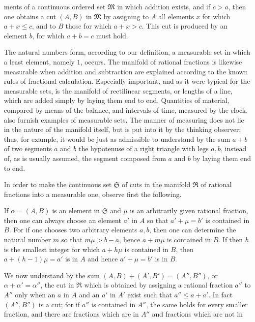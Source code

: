 ments of a continuous ordered set $\mathfrak M$ in which addition
exists, and if $c>a$, then one obtains a cut $(A,B)$ in $\mathfrak M$
by assigning to $A$ all elements $x$ for which $a+x\le c$, and to $B$
those for which $a+x>c$. This cut is produced by an element $b$, for
which $a+b=c$ must hold.

The natural numbers form, according to our definition, a measurable set
in which a least element, namely $1$, occurs. The manifold of rational
fractions is likewise measurable when addition and subtraction are
explained according to the known rules of fractional calculation.
Especially important, and as it were typical for the measurable sets,
is the manifold of rectilinear segments, or lengths of a line, which
are added simply by laying them end to end. Quantities of material,
compared by means of the balance, and intervals of time, measured by
the clock, also furnish examples of measurable sets. The manner of
measuring does not lie in the nature of the manifold itself, but is put
into it by the thinking observer; thus, for example, it would be just as
admissible to understand by the sum $a+b$ of two segments $a$ and $b$
the hypotenuse of a right triangle with legs $a,b$, instead of, as is
usually assumed, the segment composed from $a$ and $b$ by laying them
end to end.

In order to make the continuous set $\mathfrak S$ of cuts in the
manifold $\mathfrak R$ of rational fractions into a measurable one,
observe first the following.

If $\alpha=(A,B)$ is an element in $\mathfrak S$ and $\mu$ is an
arbitrarily given rational fraction, then one can always choose an
element $a'$ in $A$ so that $a'+\mu=b'$ is contained in $B$. For if one
chooses two arbitrary elements $a,b$, then one can determine the
natural number $m$ so that $m\mu>b-a$, hence $a+m\mu$ is contained in
$B$. If then $h$ is the smallest integer for which $a+h\mu$ is
contained in $B$, then $a+(h-1)\mu=a'$ is in $A$ and hence
$a'+\mu=b'$ is in $B$.

We now understand by the sum $(A,B)+(A',B')=(A'',B'')$, or
$\alpha+\alpha'=\alpha''$, the cut in $\mathfrak R$ which is obtained
by assigning a rational fraction $a''$ to $A''$ only when an $a$ in
$A$ and an $a'$ in $A'$ exist such that $a''\le a+a'$. In fact
$(A'',B'')$ is a cut; for if $a''$ is contained in $A''$, the same
holds for every smaller fraction, and there are fractions which are in
$A''$ and fractions which are not in
